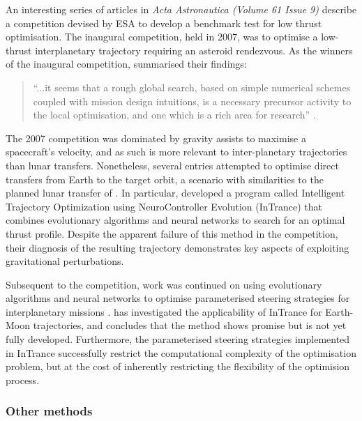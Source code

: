 An interesting series of articles in \emph{Acta Astronautica (Volume 61 Issue 9)} describe a competition devised by ESA to develop a benchmark test for low thrust optimisation. The inaugural competition, held in 2007, was to optimise a low-thrust interplanetary trajectory requiring an asteroid rendezvous. As the winners of the inaugural competition, \textcite{Petropoulos2007} summarised their findings: 

\begin{quotation}\enquote{...it seems that a rough global search, based on simple numerical schemes coupled with mission design intuitions, is a necessary precursor activity to the local optimisation, and one which is a rich area for research} \parencite[p. 814]{Petropoulos2007}.\end{quotation}

The 2007 competition was dominated by gravity assists to maximise a spacecraft's velocity, and as such is more relevant to inter-planetary trajectories than lunar transfers. Nonetheless, several entries attempted to optimise direct transfers from Earth to the target orbit, a scenario with similarities to the planned lunar transfer of \BW. In particular, \textcite{Dachwald2007} developed a program called Intelligent Trajectory Optimization using NeuroController Evolution (InTrance) that combines evolutionary algorithms and neural networks to search for an optimal thrust profile. Despite the apparent failure of this method in the competition, their diagnosis of the resulting trajectory demonstrates key aspects of exploiting gravitational perturbations. %

Subsequent to the competition, work was continued on using evolutionary algorithms and neural networks to optimise parameterised steering strategies for interplanetary missions \parencite{Carnelli2007, Carnelli2009}.  \textcite{Ohndorf2009} has investigated the applicability of InTrance for Earth-Moon trajectories, and concludes that the method shows promise but is not yet fully developed. Furthermore, the parameterised steering strategies implemented in InTrance successfully restrict the computational complexity of the optimisation problem, but at the cost of inherently restricting the flexibility of the optimision process.




\subsubsection{Other methods} \label{sub:Other-lit}

